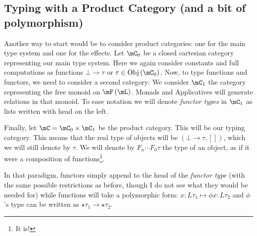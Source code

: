 \documentclass[math, english, info]{cours}
\begin{document}
\subsection{Typing with a Product Category (and a bit of polymorphism)}
Another way to start would be to consider product categories: one for the main type system and one for the effects.
Let $\mC_{0}$ be a closed cartesian category representing our main type system.
Here we again consider constants and full computations as functions $\bot \to \tau$ or $\tau \in \mathrm{Obj}\left( \mC_{0} \right)$.
Now, to type functions and functors, we need to consider a second category:
We consider $\mC_{1}$ the category representing the free monoid on $\mF\left( \mL \right)$.
Monads and Applicatives will generate relations in that monoid.
To ease notation we will denote \emph{functor types} in $\mC_{1}$ as lists written with head on the left.

Finally, let $\mC = \mC_{0} \times \mC_{1}$ be the product category. This will be our typing category.
This means that the real type of objects will be $\left( \bot \to \tau, [] \right)$, which we will still denote by $\tau$.
We will denote by $F_{n} \cdots F_{0} \tau$ the type of an object, as if it were a composition of functions\footnote{It is!}.

In that paradigm, functors simply append to the head of the \emph{functor type} (with the same possible restrictions as before, though I do not see what they would be needed for) while functions will take a polymorphic form:
$x: L\tau_{1} \mapsto \phi x: L\tau_{2}$ and $\phi$'s type can be written as $\star\tau_{1} \to \star\tau_{2}$.



\end{document}
